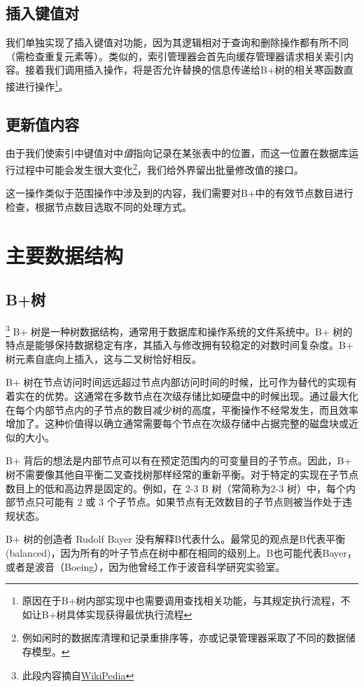 \documentclass[UTF8]{ctexrep} %
\begin{document}
\subsection{插入键值对}
我们单独实现了插入键值对功能，因为其逻辑相对于查询和删除操作都有所不同（需检查重复元素等）。类似的，索引管理器会首先向缓存管理器请求相关索引内容。接着我们调用插入操作，将是否允许替换的信息传递给B+树的相关寒函数直接进行操作\footnote{原因在于B+树内部实现中也需要调用查找相关功能，与其规定执行流程，不如让B+树具体实现获得最优执行流程}。

\subsection{更新值内容}
由于我们使索引中键值对中\textit{值}指向记录在某张表中的位置，而这一位置在数据库运行过程中可能会发生很大变化\footnote{例如闲时的数据库清理和记录重排序等，亦或记录管理器采取了不同的数据储存模型。}，我们给外界留出批量修改值的接口。
\par
这一操作类似于范围操作中涉及到的内容，我们需要对B+中的有效节点数目进行检查，根据节点数目选取不同的处理方式。

\section{主要数据结构}
\subsection{B+树}
\footnote{此段内容摘自\href{https://en.wikipedia.org/wiki/B+_tree}{WikiPedia}}
B+ 树是一种树数据结构，通常用于数据库和操作系统的文件系统中。B+ 树的特点是能够保持数据稳定有序，其插入与修改拥有较稳定的对数时间复杂度。B+ 树元素自底向上插入，这与二叉树恰好相反。
\par
B+ 树在节点访问时间远远超过节点内部访问时间的时候，比可作为替代的实现有着实在的优势。这通常在多数节点在次级存储比如硬盘中的时候出现。通过最大化在每个内部节点内的子节点的数目减少树的高度，平衡操作不经常发生，而且效率增加了。这种价值得以确立通常需要每个节点在次级存储中占据完整的磁盘块或近似的大小。
\par
B+ 背后的想法是内部节点可以有在预定范围内的可变量目的子节点。因此，B+ 树不需要像其他自平衡二叉查找树那样经常的重新平衡。对于特定的实现在子节点数目上的低和高边界是固定的。例如，在 2-3 B 树（常简称为2-3 树）中，每个内部节点只可能有 2 或 3 个子节点。如果节点有无效数目的子节点则被当作处于违规状态。
\par
B+ 树的创造者 Rudolf Bayer 没有解释B代表什么。最常见的观点是B代表平衡(balanced)，因为所有的叶子节点在树中都在相同的级别上。B也可能代表Bayer，或者是波音（Boeing），因为他曾经工作于波音科学研究实验室。
\end{document}
